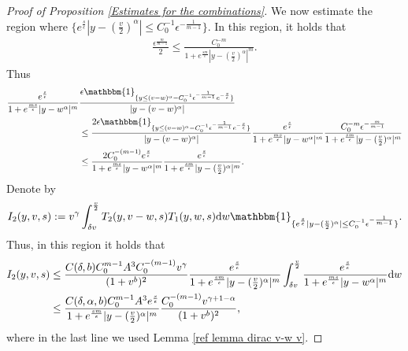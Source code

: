 \documentclass[11pt]{article}
\numberwithin{equation}{section}
\newcommand{\der}{\textup{d}}
\begin{document}
\begin{proof}[Proof of Proposition \ref{Estimates for the combinations}]



 We now estimate the region where $\{e^{\frac{s}{\epsilon}}|y-(\frac{v}{2})^{\alpha}|\leq C_{0}^{-1}\epsilon^{-\frac{1}{m-1}}\}$. In this region, it holds that
 \begin{align*}
     \frac{\epsilon^{\frac{m}{m-1}}}{2}\leq \frac{C_{0}^{-m}}{1+e^{\frac{sm}{\epsilon}}|y-(\frac{v}{2})^{\alpha}|^{m}}.
 \end{align*}
 Thus
\begin{align*}
  \frac{e^{\frac{s}{\epsilon}}}{1+e^{\frac{ms}{\epsilon}}|y-w^{\alpha}|^{m}}&\frac{\epsilon\mathbbm{1}_{\{y\leq (v-w)^{\alpha}-C_{0}^{-1}\epsilon^{-\frac{1}{m-1}}e^{-\frac{s}{\epsilon}}\}}}{|y-(v-w)^{\alpha}|}\\
   &\leq  \frac{2\epsilon \mathbbm{1}_{\{y\leq (v-w)^{\alpha}-C_{0}^{-1}\epsilon^{-\frac{1}{m-1}}e^{-\frac{s}{\epsilon}}\}} }{|y-(v-w)^{\alpha}|}  \frac{e^{\frac{s}{\epsilon}}}{1+e^{\frac{ms}{\epsilon}}|y-w^{\alpha}|^{m}}\frac{C_{0}^{-m}\epsilon^{-\frac{m}{m-1}}}{1+e^{\frac{sm}{\epsilon}}|y-(\frac{v}{2})^{\alpha}|^{m}}\\
   &\leq  \frac{2 C_{0}^{-(m-1)}e^{\frac{s}{\epsilon}}}{1+e^{\frac{ms}{\epsilon}}|y-w^{\alpha}|^{m}}\frac{e^{\frac{s}{\epsilon}}}{1+e^{\frac{sm}{\epsilon}}|y-(\frac{v}{2})^{\alpha}|^{m}}.
\end{align*}
Denote by
      \begin{align*}
      I_{2}(y,v,s):=  v^{\gamma}\int_{\delta v}^{\frac{v}{2}} T_{2}(y,v-w,s)T_{1}(y,w,s)\der w\mathbbm{1}_{\{e^{\frac{s}{\epsilon}}|y-(\frac{v}{2})^{\alpha}|\leq C_{0}^{-1}\epsilon^{-\frac{1}{m-1}}\}}.
      \end{align*}
Thus, in this region it holds that
\begin{align*}
  I_{2}(y,v,s)&\leq \frac{C(\delta,b)C_{0}^{m-1}A^{3} C_{0}^{-(m-1)} v^{\gamma}}{(1+v^{b})^{2}} \frac{e^{\frac{s}{\epsilon}}}{1+e^{\frac{sm}{\epsilon}}|y-(\frac{v}{2})^{\alpha}|^{m}}\int_{\delta v}^{\frac{v}{2}} \frac{e^{\frac{s}{\epsilon}}}{1+e^{\frac{ms}{\epsilon}}|y-w^{\alpha}|^{m}}\der w\\
& \leq \frac{C(\delta,\alpha,b)C_{0}^{m-1}A^{3} e^{\frac{s}{\epsilon}}}{1+e^{\frac{sm}{\epsilon}}|y-(\frac{v}{2})^{\alpha}|^{m}} \frac{ C_{0}^{-(m-1)} v^{\gamma+1-\alpha}}{(1+v^{b})^{2}},
\end{align*}
 where in the last line we used Lemma \ref{ref lemma dirac v-w v}.


\end{proof}
\end{document}
